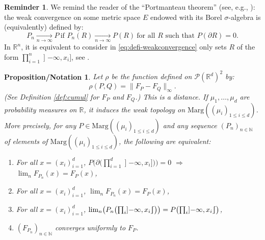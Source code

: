 \documentclass[JEP,XML,SOM,Unicode,NoEqCountersInSection,NoFloatCountersInSection,published]{cedram}
\renewcommand{\theenumi}{\alph{enumi}}
\renewcommand{\theenumii}{\roman{enumii}}
\newenvironment{enumeratei}
{\bgroup\def\theenumi{\roman{enumi}}\def\theenumii{\arabic{enumii}}\begin{enumerate}}
{\end{enumerate}\egroup}
\theoremstyle{plain}
\newtheorem{pronotation}[them]{Proposition/Notation}
\theoremstyle{definition}
\newtheorem{reminder}[them]{Reminder}
\newcommand{\p}{\mathcal{P}}
\newcommand{\ma}{\mathrm{Marg}}
\newcommand{\R}{\mathbb{R}}
\newcommand{\N}{\mathbb{N}}
\newcommand{\op}{\mathopen}
\newcommand{\clo}{\mathclose}
\newcommand{\rsemibracket}{\mathclose{\rfloor\hspace*{-.9ex}\lceil}}
\begin{document}
\begin{reminder}\label{remind:billingsley}We remind the reader of the ``Portmanteau theorem'' (see, e.g., \cite[Th.\,2.1]{Bi}): the weak convergence on some metric space $E$ endowed with its Borel $\sigma$-algebra is (equivalently) defined by:
\begin{equation}\label{eq:defi-weakconvergence}P_n\underset{n\to\infty}{\longrightarrow}P\ \text{if }P_n(R)\underset{n\to\infty}{\longrightarrow}P(R)\ \text{for all $R$ such that }P(\partial R)=0.
\end{equation}
In $\R^n$, it is equivalent to consider in \eqref{eq:defi-weakconvergence} only sets $R$ of the form $\prod_{i=1}^n\op]-\infty,x_i\clo]$, see \cite[Exam.\,2.3 p.\,18]{Bi}.
\end{reminder}

\begin{pronotation}\label{pro:rho} Let $\rho$ be the function defined on $\p(\R^d)^2$ by:
\[\rho(P,Q)=\|F_P-F_Q\|_\infty.\]
(See Definition \ref{def:cumul} for $F_P$ and $F_Q$.) This is a distance. If $\mu_1,\ldots,\mu_d$ are probability measures on $\R$, it induces the weak topology on $\ma((\mu_i)_{1\leq i\leq d})$. More precisely, for any $P\in\ma((\mu_i)_{1\leq i\leq d})$ and any sequence $(P_n)_{n\in\N}$ of elements of $\ma((\mu_i)_{1\leq i\leq d})$, the following are equivalent:
\begin{enumeratei}
\item\label{pro:rhoi}
For all $x=(x_i)_{i=1}^d$, $P\bigl(\partial\bigl( \prod_{i=1}^d\op]-\infty,x_i\clo]\bigr)\bigr)=0$ $\Rightarrow$ $\lim_nF_{P_n}(x)=F_{P}(x)$,

\item\label{pro:rhoii}
For all $x=(x_i)_{i=1}^d$, $\lim_nF_{P_n}(x)=F_{P}(x)$,

\bgroup\renewcommand{\theenumi}{\roman{enumi}'}\setcounter{enumi}{1}
\item\label{pro:rhoii'}
For all $x=(x_i)_{i=1}^d$, $\lim_n\bigl(P_n\bigl(\prod_i\op]-\infty,x_i\rsemibracket\bigr)\bigr)=P\bigl(\prod_i\op]-\infty,x_i\rsemibracket\bigr)$,
\egroup

\item\label{pro:rhoiii}
$(F_{P_n})_{n\in \N}$ converges uniformly to $F_P$.
\end{enumeratei}
\end{pronotation}
\end{document}
